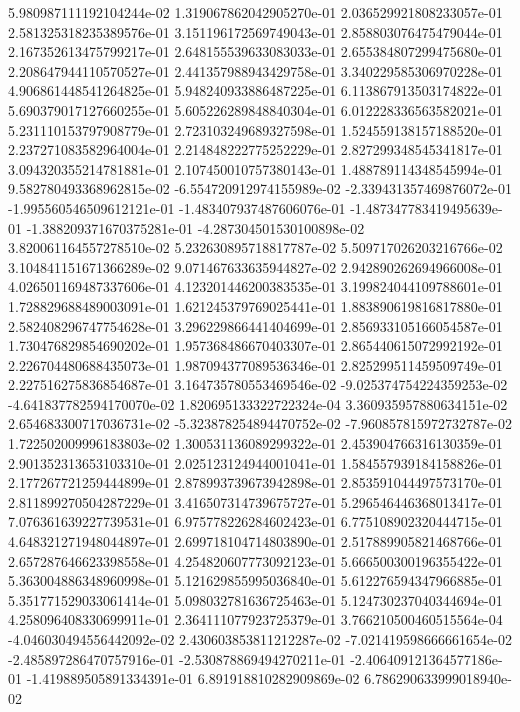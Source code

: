 5.980987111192104244e-02
1.319067862042905270e-01
2.036529921808233057e-01
2.581325318235389576e-01
3.151196172569749043e-01
2.858803076475479044e-01
2.167352613475799217e-01
2.648155539633083033e-01
2.655384807299475680e-01
2.208647944110570527e-01
2.441357988943429758e-01
3.340229585306970228e-01
4.906861448541264825e-01
5.948240933886487225e-01
6.113867913503174822e-01
5.690379017127660255e-01
5.605226289848840304e-01
6.012228336563582021e-01
5.231110153797908779e-01
2.723103249689327598e-01
1.524559138157188520e-01
2.237271083582964004e-01
2.214848222775252229e-01
2.827299348545341817e-01
3.094320355214781881e-01
2.107450010757380143e-01
1.488789114348545994e-01
9.582780493368962815e-02
-6.554720912974155989e-02
-2.339431357469876072e-01
-1.995560546509612121e-01
-1.483407937487606076e-01
-1.487347783419495639e-01
-1.388209371670375281e-01
-4.287304501530100898e-02
3.820061164557278510e-02
5.232630895718817787e-02
5.509717026203216766e-02
3.104841151671366289e-02
9.071467633635944827e-02
2.942890262694966008e-01
4.026501169487337606e-01
4.123201446200383535e-01
3.199824044109788601e-01
1.728829688489003091e-01
1.621245379769025441e-01
1.883890619816817880e-01
2.582408296747754628e-01
3.296229866441404699e-01
2.856933105166054587e-01
1.730476829854690202e-01
1.957368486670403307e-01
2.865440615072992192e-01
2.226704480688435073e-01
1.987094377089536346e-01
2.825299511459509749e-01
2.227516275836854687e-01
3.164735780553469546e-02
-9.025374754224359253e-02
-4.641837782594170070e-02
1.820695133322722324e-04
3.360935957880634151e-02
2.654683300717036731e-02
-5.323878254894470752e-02
-7.960857815972732787e-02
1.722502009996183803e-02
1.300531136089299322e-01
2.453904766316130359e-01
2.901352313653103310e-01
2.025123124944001041e-01
1.584557939184158826e-01
2.177267721259444899e-01
2.878993739673942898e-01
2.853591044497573170e-01
2.811899270504287229e-01
3.416507314739675727e-01
5.296546446368013417e-01
7.076361639227739531e-01
6.975778226284602423e-01
6.775108902320444715e-01
4.648321271948044897e-01
2.699718104714803890e-01
2.517889905821468766e-01
2.657287646623398558e-01
4.254820607773092123e-01
5.666500300196355422e-01
5.363004886348960998e-01
5.121629855995036840e-01
5.612276594347966885e-01
5.351771529033061414e-01
5.098032781636725463e-01
5.124730237040344694e-01
4.258096408330699911e-01
2.364111077923725379e-01
3.766210500460515564e-04
-4.046030494556442092e-02
2.430603853811212287e-02
-7.021419598666661654e-02
-2.485897286470757916e-01
-2.530878869494270211e-01
-2.406409121364577186e-01
-1.419889505891334391e-01
6.891918810282909869e-02
6.786290633999018940e-02
